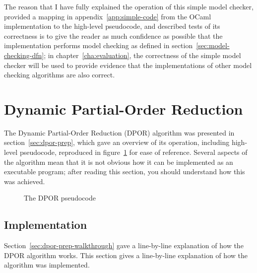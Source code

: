 \documentclass[12pt,a4paper,twoside,openright]{report}
\begin{document}
The reason that I have fully explained
the operation of this simple model checker,
provided a mapping
in appendix~\ref{app:simple-code} from the OCaml
implementation to the high-level
pseudocode, and described
tests of its correctness is to give the reader
as much confidence as possible
that the implementation performs
model checking as defined in
section~\ref{sec:model-checking-dfn}; in
chapter~\ref{cha:evaluation}, the
correctness of the simple model checker will be used
to provide evidence that the implementations of
other model checking algorithms are also correct.

\section{Dynamic Partial-Order Reduction}
The Dynamic Partial-Order Reduction (DPOR)
algorithm was presented in section~\ref{sec:dpor-prep},
which gave an overview of its operation,
including high-level pseudocode, reproduced
in figure~\ref{fig:dpor-imp-pscode} for ease
of reference. Several
aspects of the algorithm mean that it
is not obvious how it can be implemented
as an executable program; after reading
this section, you should understand
how this was achieved.

\begin{figure}
	\dporpseudocode
	\caption{The DPOR pseudocode}
	\label{fig:dpor-imp-pscode}
\end{figure}

\subsection{Implementation}
Section~\ref{sec:dpor-prep-walkthrough} gave a
line-by-line explanation of how
the DPOR algorithm works. This section gives a
line-by-line explanation of how the algorithm
was implemented.
\end{document}
